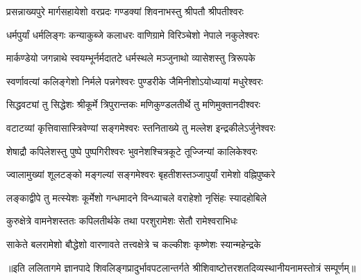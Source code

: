 \twolineshloka
{प्रसन्नाख्यपुरे मार्गसहायेशो वरप्रदः}
{गण्डक्यां शिवनाभस्तु श्रीपतौ श्रीपतीश्वरः}


\twolineshloka
{धर्मपुर्यां धर्मलिङ्गः कन्याकुब्जे कलाधरः}
{वाणिग्रामे विरिञ्चेशो नेपाले नकुलेश्वरः}

\twolineshloka
{मार्कण्डेयो जगन्नाथे स्वयम्भूर्नर्मदातटे}
{धर्मस्थले मञ्जुनाथो व्यासेशस्तु त्रिरूपके}

\twolineshloka
{स्वर्णावत्यां कलिङ्गेशो निर्मले पन्नगेश्वरः}
{पुण्डरीके जैमिनीशोऽयोध्यायां मधुरेश्वरः}

\twolineshloka
{सिद्धवट्यां तु सिद्धेशः श्रीकूर्मे त्रिपुरान्तकः}
{मणिकुण्डलतीर्थे तु मणिमुक्तानदीश्वरः}

\twolineshloka
{वटाटव्यां कृत्तिवासास्त्रिवेण्यां सङ्गमेश्वरः}
{स्तनिताख्ये तु मल्लेश इन्द्रकीलेऽर्जुनेश्वरः}

\twolineshloka
{शेषाद्रौ कपिलेशस्तु पुष्पे पुष्पगिरीश्वरः}
{भुवनेशश्चित्रकूटे तूज्जिन्यां कालिकेश्वरः}

\twolineshloka
{ज्वालामुख्यां शूलटङ्को मङ्गल्यां सङ्गमेश्वरः}
{बृहतीशस्तञ्जापुर्यां रामेशो वह्निपुष्करे}

\twolineshloka
{लङ्काद्वीपे तु मत्स्येशः कूर्मेशो गन्धमादने}
{विन्ध्याचले वराहेशो नृसिंहः स्यादहोबिले}

\twolineshloka
{कुरुक्षेत्रे वामनेशस्ततः कपिलतीर्थके}
{तथा परशुरामेशः सेतौ रामेश्वराभिधः}

\twolineshloka
{साकेते बलरामेशो बौद्धेशो वारणावते}
{तत्त्वक्षेत्रे च कल्कीशः कृष्णेशः स्यान्महेन्द्रके}

{॥इति ललितागमे ज्ञानपादे शिवलिङ्गप्रादुर्भावपटलान्तर्गते श्रीशिवाष्टोत्तरशतदिव्यस्थानीयनामस्तोत्रं सम्पूर्णम्॥}